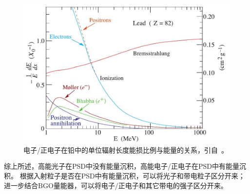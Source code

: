 \begin{figure}[t]
\centering
\includegraphics[width=0.8\linewidth]{chap/description/fig/electron_energyloss}
\caption{电子/正电子在铅中的单位辐射长度能损比例与能量的关系，引自~\parencite{pdg_book}。}
\label{fig:ch2:electron_energyloss}
\end{figure}

综上所述，高能光子在PSD中没有能量沉积，高能电子/正电子在PSD中有能量沉积。
根据入射粒子是否在PSD中有能量沉积，可以将光子和带电粒子区分开来；进一步结合BGO量能器，可以将电子/正电子和其它带电的强子区分开来。

